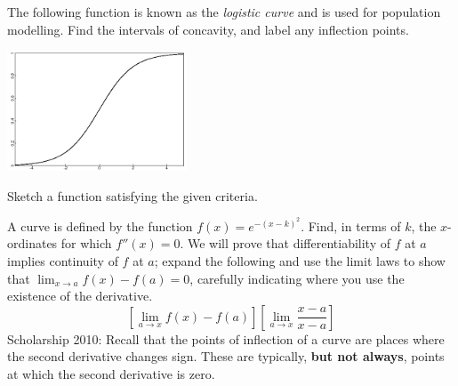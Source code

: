 \begin{questions}
  \questioA The following function is known as the \textit{logistic curve} and is used for population modelling. Find the intervals of
            concavity, and label any inflection points.
            \begin{center}
              \includegraphics[width=0.4\textwidth]{logistic}
            \end{center}
  \questioM Sketch a function satisfying the given criteria.
  \questioE A curve is defined by the function $ f(x) = e^{-(x-k)^2} $. Find, in terms of $ k $, the $ x$-ordinates for which $ f''(x) = 0 $.
  \clearpage
  \questioS We will prove that differentiability of $ f $ at $ a $ implies continuity of $ f $ at $ a $; expand the following
            and use the limit laws to show that $ \lim_{x \to a} f(x) - f(a) = 0 $, carefully indicating where you use the existence
            of the derivative.
            \begin{displaymath}
              \left[\lim_{a \to x} f(x) - f(a)\right]\left[\lim_{a \to x} \frac{x - a}{x - a}\right]
            \end{displaymath}
  \questioS Scholarship 2010: Recall that the points of inflection of a curve are places where the second derivative
            changes sign. These are typically, \textbf{but not always}, points at which the second derivative is zero.


\end{questions}
